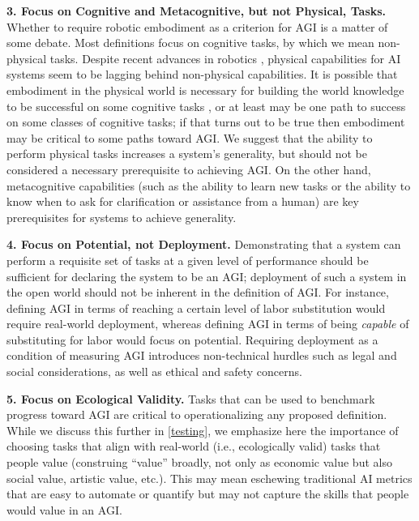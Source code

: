 \documentclass{article}
\theoremstyle{plain}
\theoremstyle{definition}
\theoremstyle{remark}
\begin{document}
\textbf{3. Focus on Cognitive and Metacognitive, but not Physical, Tasks.} Whether to require robotic embodiment \citep{roy2021machine} as a criterion for AGI is a matter of some debate. Most definitions focus on cognitive tasks, by which we mean non-physical tasks. Despite recent advances in robotics \citep{brohan2023rt2}, physical capabilities for AI systems seem to be lagging behind non-physical capabilities. It is possible that embodiment in the physical world is necessary for building the world knowledge to be successful on some cognitive tasks \citep{murrayEmbody}, or at least may be one path to success on some classes of cognitive tasks; if that turns out to be true then embodiment may be critical to some paths toward AGI. We suggest that the ability to perform physical tasks increases a system’s generality, but should not be considered a necessary prerequisite to achieving AGI. On the other hand, metacognitive capabilities (such as the ability to learn new tasks or the ability to know when to ask for clarification or assistance from a human) are key prerequisites for systems to achieve generality.  

\textbf{4. Focus on Potential, not Deployment.} Demonstrating that a system can perform a requisite set of tasks at a given level of performance should be sufficient for declaring the system to be an AGI; deployment of such a system in the open world should not be inherent in the definition of AGI. For instance, defining AGI in terms of reaching a certain level of labor substitution would require real-world deployment, whereas defining AGI in terms of being \textit{capable} of substituting for labor would focus on potential. Requiring deployment as a condition of measuring AGI introduces non-technical hurdles such as legal and social considerations, as well as ethical and safety concerns. 

\textbf{5. Focus on Ecological Validity.} Tasks that can be used to benchmark progress toward AGI are critical to operationalizing any proposed definition. While we discuss this further in \cref{testing}, we emphasize here the importance of choosing tasks that align with real-world (i.e., ecologically valid) tasks that people value (construing “value” broadly, not only as economic value but also social value, artistic value, etc.). This may mean eschewing traditional AI metrics that are easy to automate or quantify \citep{raji2021ai} but may not capture the skills that people would value in an AGI. 
\end{document}
